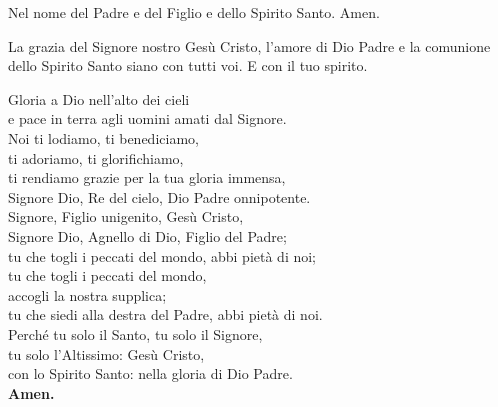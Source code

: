 \documentclass[11pt]{book}
\begin{document}
%    
%    



\celebrante
{Nel nome del Padre e del Figlio e dello Spirito Santo.}
{Amen.}

\celebrante
{La grazia del Signore nostro Gesù Cristo, l'amore di Dio Padre e
la comunione dello Spirito Santo siano con tutti voi.}
{E con il tuo spirito.}

\vspace{15pt}


\introduzione[2]

\memoriaDelBattesimo

\settowidth{\versewidth}{Signore Dio, Re del cielo, Dio Padre onnipotente.}
\begin{canzone}[\versewidth]
Gloria a Dio nell'alto dei cieli\\
e pace in terra agli uomini amati dal Signore.\\
Noi ti lodiamo, ti benediciamo,\\
ti adoriamo, ti glorifichiamo,\\
ti rendiamo grazie per la tua gloria immensa,\\
Signore Dio, Re del cielo, Dio Padre onnipotente.\\
Signore, Figlio unigenito, Gesù Cristo,\\
Signore Dio, Agnello di Dio, Figlio del Padre;\\
tu che togli i peccati del mondo, abbi pietà di noi;\\
tu che togli i peccati del mondo,\\
accogli la nostra supplica;\\
tu che siedi alla destra del Padre, abbi pietà di noi.\\
Perché tu solo il Santo, tu solo il Signore,\\
tu solo l’Altissimo: Gesù Cristo,\\
con lo Spirito Santo: nella gloria di Dio Padre.\\
\textbf{Amen.}
\end{canzone}
\end{document}
